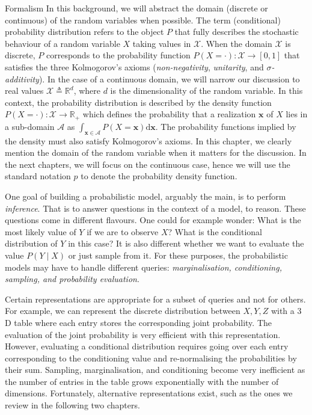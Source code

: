 \begin{side_note}{Formalism}
  In this background, we will abstract the domain (discrete or continuous) of the random variables when possible. The term (conditional) probability distribution refers to the object $P$ that fully describes the stochastic behaviour of a random variable $X$ taking values in $\mathcal{X}$. When the domain $\mathcal{X}$ is discrete, $P$ corresponds to the probability function $P(X=\cdot): \mathcal{X} \rightarrow \left[0, 1 \right]$ that satisfies the three Kolmogorov's axioms (\textit{non-negativity}, \textit{unitarity}, and \textit{$\sigma$-\textit{additivity}}). In the case of a continuous domain, we will narrow our discussion to real values $\mathcal{X} \triangleq \mathbb{R}^d$, where $d$ is the dimensionality of the random variable. In this context, the probability distribution is described by the density function $P(X=\cdot): \mathcal{X} \rightarrow \mathbb{R}_{+}$ which defines the probability that a realization $\bm{x}$ of $X$ lies in a sub-domain $\mathcal{A}$ as $\int_{\bm{x} \in \mathcal{A}} P(X=\bm{x}) \text{d} \bm{x}$. The probability functions implied by the density must also satisfy Kolmogorov's axioms. In this chapter, we clearly mention the domain of the random variable when it matters for the discussion. In the next chapters, we will focus on the continuous case, hence we will use the standard notation $p$ to denote the probability density function.
\end{side_note}

One goal of building a probabilistic model, arguably the main, is to perform \textit{inference}. That is to answer questions in the context of a model, to reason. These questions come in different flavours. One could for example wonder: What is the most likely value of $Y$ if we are to observe $X$? What is the conditional distribution of $Y$ in this case? It is also different whether we want to evaluate the value $P(Y \mid X)$ or just sample from it. For these purposes, the probabilistic models may have to handle different queries: \textit{marginalisation, conditioning, sampling, and probability evaluation}.

Certain representations are appropriate for a subset of queries and not for others. For example, we can represent the discrete distribution between $X, Y, Z$ with a $3$D table where each entry stores the corresponding joint probability. The evaluation of the joint probability is very efficient with this representation. However, evaluating a conditional distribution requires going over each entry corresponding to the conditioning value and re-normalising the probabilities by their sum. Sampling, marginalisation, and conditioning become very inefficient as the number of entries in the table grows exponentially with the number of dimensions. Fortunately, alternative representations exist, such as the ones we review in the following two chapters.

